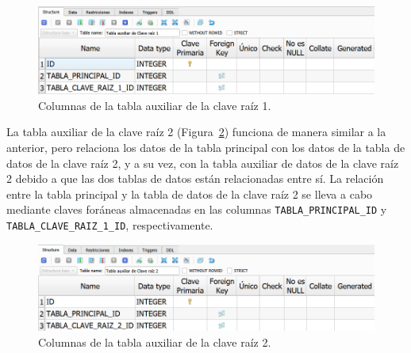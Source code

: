 \begin{figure}[H]
\centering
\includegraphics[width=.9\textwidth]{fig/Base de datos estructura/Columnas tabla auxiliar de clave raiz 1.png}
\caption{Columnas de la tabla auxiliar de la clave raíz 1.}
\label{fig:ColumnasTablaAuxiliarClaveRaiz1}
\end{figure}

La tabla auxiliar de la clave raíz 2 (Figura~\ref{fig:ColumnasTablaAuxiliarClaveRaiz2}) funciona de manera similar a la anterior, pero relaciona los datos de la tabla principal con los datos de la tabla de datos de la clave raíz 2, y a su vez, con la tabla auxiliar de datos de la clave raíz 2 debido a que las dos tablas de datos están relacionadas entre sí. La relación entre la tabla principal y la tabla de datos de la clave raíz 2 se lleva a cabo mediante claves foráneas almacenadas en las columnas \texttt{TABLA\_PRINCIPAL\_ID} y \texttt{TABLA\_CLAVE\_RAIZ\_1\_ID}, respectivamente.

\begin{figure}[H]
\centering
\includegraphics[width=.9\textwidth]{fig/Base de datos estructura/Columnas tabla auxiliar de clave raiz 2.png}
\caption{Columnas de la tabla auxiliar de la clave raíz 2.}
\label{fig:ColumnasTablaAuxiliarClaveRaiz2}
\end{figure}

